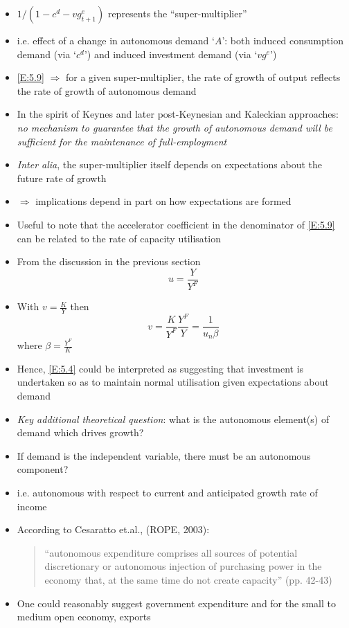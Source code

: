 \documentclass{article}
\begin{document}
\begin{itemize}
\begin{equation}
		\end{equation}
		\item \( 1/\left( 1-c^d-vg_{t+1}^e \right) \) represents the ``super-multiplier''
		\item i.e. effect of a change in autonomous demand `\( A \)': both induced consumption demand (via `\( c^d \)') and induced investment demand (via `\( v g^e \)')
		\item \cref{E:5.9} \( \Rightarrow \) for a given super-multiplier, the rate of growth of output reflects the rate of growth of autonomous demand
		\item In the spirit of Keynes and later post-Keynesian and Kaleckian approaches: \textit{no mechanism to guarantee that the growth of autonomous demand will be sufficient for the maintenance of full-employment}
		\item \textit{Inter alia}, the super-multiplier itself depends on expectations about the future rate of growth
		\item \( \Rightarrow \) implications depend in part on how expectations are formed
		\item Useful to note that the accelerator coefficient in the denominator of \cref{E:5.9} can be related to the rate of capacity utilisation
		\item From the discussion in the previous section
		\[
			u = \frac{Y}{Y^F}
		\]
		\item With \( v=\frac{K}{Y} \) then
		\[
			v=\frac{K}{Y^F}\frac{Y^F}{Y}=\frac{1}{u_n\beta}
		\]
		where \( \beta=\frac{Y^F}{K} \)
		\item Hence, \cref{E:5.4} could be interpreted as suggesting that investment is undertaken so as to maintain normal utilisation given expectations about demand
		\item \textit{Key additional theoretical question}: what is the autonomous element(s) of demand which drives growth?
		\item If demand is the independent variable, there must be an autonomous component?
		\item i.e. autonomous with respect to current and anticipated growth rate of income
		\item According to Cesaratto et.al., (ROPE, 2003):
		\begin{quote}
			``autonomous expenditure comprises all sources of potential discretionary or autonomous injection of purchasing power in the economy that, at the same time do not create capacity'' (pp. 42-43)
		\end{quote}
		\item One could reasonably suggest government expenditure and for the small to medium open economy, exports

\end{itemize}
\end{document}
